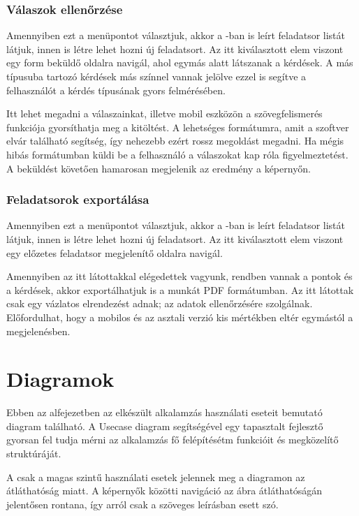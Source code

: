 \subsubsection{Válaszok ellenőrzése}

Amennyiben ezt a menüpontot választjuk, akkor a -ban is leírt feladatsor listát látjuk, innen is létre lehet hozni új feladatsort.
Az itt kiválasztott elem viszont egy form beküldő oldalra navigál, ahol egymás alatt látszanak a kérdések.
A más típusuba tartozó kérdések más színnel vannak jelölve ezzel is segítve a felhasználót a kérdés típusának gyors felmérésében.

Itt lehet megadni a válaszainkat, illetve mobil eszközön a szövegfelismerés funkciója gyorsíthatja meg a kitöltést.
A lehetséges formátumra, amit a szoftver elvár található segítség, így nehezebb ezért rossz megoldást megadni.
Ha mégis hibás formátumban küldi be a felhasználó a válaszokat kap róla figyelmeztetést.
A beküldést követően hamarosan megjelenik az eredmény a képernyőn.

\subsubsection{Feladatsorok exportálása}

Amennyiben ezt a menüpontot választjuk, akkor a -ban is leírt feladatsor listát látjuk, innen is létre lehet hozni új feladatsort.
Az itt kiválasztott elem viszont egy előzetes feladatsor megjelenítő oldalra navigál.

Amennyiben az itt látottakkal elégedettek vagyunk, rendben vannak a pontok és a kérdések, akkor exportálhatjuk is a munkát PDF formátumban.
Az itt látottak csak egy vázlatos elrendezést adnak; az adatok ellenőrzésére szolgálnak.
Előfordulhat, hogy a mobilos és az asztali verzió kis mértékben eltér egymástól a megjelenésben.

\section{Diagramok}
\label{sec:SepcificationDiagrams}

Ebben az alfejezetben az elkészült alkalamzás használati eseteit bemutató diagram található.
A Usecase diagram segítségével egy tapasztalt fejlesztő gyorsan fel tudja mérni az alkalamzás fő felépítésétm funkcióit és megközelítő struktúráját.

A csak a magas szintű használati esetek jelennek meg a diagramon az átláthatóság miatt.
A képernyők közötti navigáció az ábra átláthatóságán jelentősen rontana, így arról csak a szöveges leírásban esett szó.

